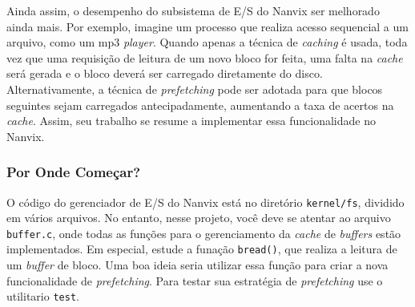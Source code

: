 \documentclass[11pt]{article}
\newif\ifbr
\newif\ifen
\begin{document}
		Ainda assim, o desempenho do subsistema de E/S do Nanvix ser
		melhorado ainda mais. Por exemplo, imagine um processo que
		realiza acesso sequencial a um arquivo, como um mp3
		\textit{player}. Quando apenas a técnica de \textit{caching} é
		usada, toda vez que uma requisição de leitura de um novo bloco
		for feita, uma falta na \textit{cache} será gerada e o bloco
		deverá ser carregado diretamente do disco. Alternativamente,
		a técnica de \textit{prefetching} pode ser adotada para que
		blocos seguintes sejam carregados antecipadamente,
		aumentando a taxa de acertos na \textit{cache}. Assim, seu
		trabalho se resume a implementar essa funcionalidade no
		Nanvix.

\else\ifen
	\subsubsection*{Assignment Description}

		The I/O subsystem in Nanvix uses the caching technique to
		speedup disk-use performance. Requests of user processes are
		directly served from in-memory buffers which the kernels
		maintains in a LRU (least recently used) in-core cache.

		Although simple, this technique yields to a better overall
		performance for the I/O subsystem in both, read and write
		requests. More precisely, caching enables delayed write for
		write requests and data reuse for read requests, thus maximizing
		the average disk-bandwidth.
		
		Nevertheless, the overall performance of the I/O subsystem may
		be further improved with prefetching. For instance, suppose a
		scenario in which a process performs linear access to a file,
		like a mp3 does. When only the caching technique is employed,
		whenever a read request is issued, a cache miss will raise and
		the request will have to be served from the disk. Alternatively,
		with prefetching, next blocks in a linear read are loaded in
		advance asynchronously, and thus increase cache hits. Therefore,
		in this assignment you should implement the prefetching
		technique in Nanvix.	

\fi\fi

\ifbr
	\subsubsection*{Por Onde Começar?}

		O código do gerenciador de E/S do Nanvix está no diretório
		\texttt{kernel/fs}, dividido em vários arquivos. No entanto,
		nesse projeto, você deve se atentar ao arquivo
		\texttt{buffer.c}, onde todas as funções para o gerenciamento da
		\textit{cache} de \textit{buffers} estão implementados. Em
		especial, estude a funação \texttt{bread()}, que realiza a
		leitura de um \textit{buffer} de bloco. Uma boa ideia seria
		utilizar essa função para criar a nova funcionalidade de
		\textit{prefetching}. Para testar sua estratégia de
		\textit{prefetching} use o utilitario \texttt{test}.
\end{document}
